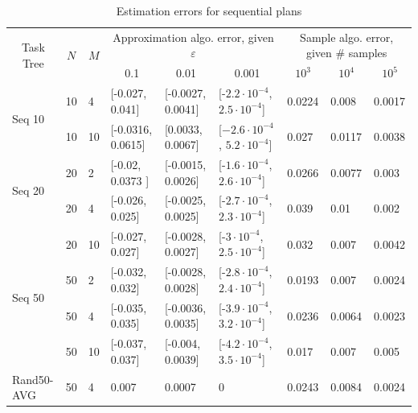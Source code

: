 \documentclass[review]{elsarticle}
\begin{document}
\begin{table}[tbh!]
	{\footnotesize
		\begin{tabular}{|l|l|l|| p{1.1cm}|p{1.1cm}|p{1.4cm}||p{0.9cm}|p{0.9cm}|p{0.9cm}|}
			\hline
			\multicolumn{1}{|c|}{\multirow{2}{*}{Task Tree}} & \multicolumn{1}{c|}{\multirow{2}{*}{$N$}} & \multicolumn{1}{c|}{\multirow{2}{*}{$M$}} & \multicolumn{3}{c|}{Approximation algo. error, given $\varepsilon$} & \multicolumn{3}{c|}{Sample algo. error, given \# samples} \\ \cline{4-9} 
			\multicolumn{1}{|c|}{} & \multicolumn{1}{c|}{} & \multicolumn{1}{c|}{} & \multicolumn{1}{c|}{0.1} & \multicolumn{1}{c|}{0.01} & \multicolumn{1}{c|}{0.001} & \multicolumn{1}{c|}{$10^{3}$} & \multicolumn{1}{c|}{$10^{4}$} & \multicolumn{1}{c|}{$10^{5}$} \\ \hline \hline
			\multirow{2}{*}{Seq 10} & 10 & 4 & [-0.027, 0.041] & [-0.0027, 0.0041] & [-$2.2 {\cdot} 10^{-4}$, $2.5 {\cdot} 10^{-4}$] & 0.0224 & 0.008 & 0.0017  \\ \cline{2-9} 
			& 10 & 10 &[-0.0316, 0.0615]  & [0.0033, 0.0067] & [$-2.6 {\cdot} 10^{-4}$, $5.2 {\cdot} 10^{-4}$] & 0.027 & 0.0117 & 0.0038  \\ \hline 
			\multirow{2}{*}{Seq 20} & 20 & 2 & [-0.02, 0.0373 ] & [-0.0015, 0.0026] & [-$1.6 {\cdot} 10^{-4}$, $2.6 {\cdot} 10^{-4}$]  & 0.0266 & 0.0077 &  0.003   \\ \cline{2-9} 
			& 20 & 4 & [-0.026, 0.025] & [-0.0025, 0.0025]  & [-$2.7{\cdot} 10^{-4}$, $2.3 {\cdot} 10^{-4}$] & 0.039 & 0.01 & 0.002 \\ \cline{2-9} 
			& 20 & 10   & [-0.027, 0.027] & [-0.0028, 0.0027] & [-$3 {\cdot} 10^{-4}$, $2.5 {\cdot} 10^{-4}$] & 0.032 & 0.007 & 0.0042  \\ \hline
			\multirow{2}{*}{Seq 50} & 50 & 2 & [-0.032, 0.032] & [-0.0028, 0.0028] & [-$2.8 {\cdot} 10^{-4}$, $2.4 {\cdot} 10^{-4}$]  & 0.0193 & 0.007 & 0.0024  \\ \cline{2-9}  
			& 50 & 4  & [-0.035, 0.035]  & [-0.0036, 0.0035] &[-$3.9 {\cdot} 10^{-4}$, $3.2 {\cdot} 10^{-4}$]  & 0.0236 & 0.0064 & 0.0023 \\ \cline{2-9}  
			& 50 & 10  & [-0.037, 0.037] & [-0.004, 0.0039] & [-$4.2 {\cdot} 10^{-4}$, $3.5 {\cdot} 10^{-4}$] & 0.017 & 0.007  & 0.005  \\ \hline
			\multirow{1}{*}{Rand50-AVG} & 50 & 4 & 0.007 & 0.0007 &  0 & 0.0243 & 0.0084 & 0.0024 \\   \hline
			
		\end{tabular}
		\caption{Estimation errors for sequential plans}
		\label{tab:errors2}
	}

\end{table}
\end{document}
